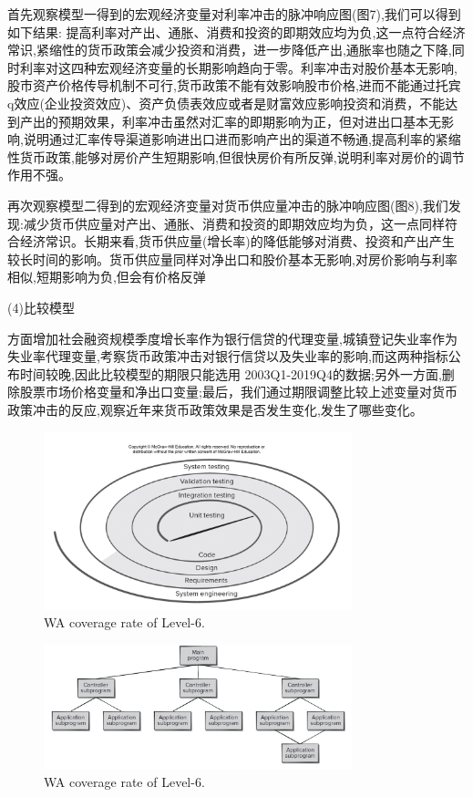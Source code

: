 \documentclass{ijclclp}
\begin{document}
首先观察模型一得到的宏观经济变量对利率冲击的脉冲响应图(图7),我们可以得到如下结果: 提高利率对产出、通胀、消费和投资的即期效应均为负,这一点符合经济常识,紧缩性的货币政策会减少投资和消费，进一步降低产出,通胀率也随之下降,同时利率对这四种宏观经济变量的长期影响趋向于零。利率冲击对股价基本无影响,股市资产价格传导机制不可行,货币政策不能有效影响股市价格,进而不能通过托宾q效应(企业投资效应)、资产负债表效应或者是财富效应影响投资和消费，不能达到产出的预期效果，利率冲击虽然对汇率的即期影响为正，但对进出口基本无影响,说明通过汇率传导渠道影响进出口进而影响产出的渠道不畅通,提高利率的紧缩性货币政策,能够对房价产生短期影响,但很快房价有所反弹,说明利率对房价的调节作用不强。

再次观察模型二得到的宏观经济变量对货币供应量冲击的脉冲响应图(图8),我们发现:减少货币供应量对产出、通胀、消费和投资的即期效应均为负，这一点同样符合经济常识。长期来看,货币供应量(增长率)的降低能够对消费、投资和产出产生较长时间的影响。货币供应量同样对净出口和股价基本无影响,对房价影响与利率相似,短期影响为负,但会有价格反弹

(4)比较模型

方面增加社会融资规模季度增长率作为银行信贷的代理变量,城镇登记失业率作为失业率代理变量,考察货币政策冲击对银行信贷以及失业率的影响,而这两种指标公布时间较晚,因此比较模型的期限只能选用 2003Q1-2019Q4的数据;另外一方面,删除股票市场价格变量和净出口变量;最后，我们通过期限调整比较上述变量对货币政策冲击的反应,观察近年来货币政策效果是否发生变化,发生了哪些变化。

\begin{figure}[h]
    \centering
    \includegraphics[width=0.8\textwidth]{img/图7.png}
    \caption{WA coverage rate of Level-6.}
\end{figure}
\begin{figure}[h]
    \centering
    \includegraphics[width=0.8\textwidth]{img/图8.png}
    \caption{WA coverage rate of Level-6.}
\end{figure}
\textbf{}\\
\end{document}

